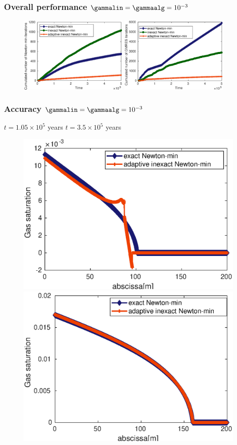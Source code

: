 \documentclass[aspectratio=169]{beamer}
\begin{document}
%
\begin{frame}
\frametitle{Overall performance $\gammalin = \gammaalg = 10^{-3}$}
\begin{figure}
\centering
\includegraphics[width=0.47\textwidth]{fig_article_chap_3/Cumulated_number_Newton_iterations_three_methods_Nx_1000}
\hspace{0.6 cm}
\includegraphics[width=0.47\textwidth]{fig_article_chap_3/Cumulated_number_gmres_iterations_three_methods_Nx_1000}
\end{figure}
\end{frame}
%
\begin{frame}
\frametitle{Accuracy  $\gammalin = \gammaalg = 10^{-3}$}
\vspace{-0.1 cm}
\textcolor{cadmiumgreen}{$t = 1.05 \times 10^5$ years \hspace{8 cm} $t = 3.5 \times 10^5$ years}
\begin{figure}
\centering
\includegraphics[width=0.48 \textwidth]{fig_article_chap_3/comparaison_plot_gas_saturations_exact_adapt_inexact_gamma_lin_gamma_alg_10-3_nt_21}
\includegraphics[width=0.48 \textwidth]{fig_article_chap_3/comparaison_plot_gas_saturations_exact_adapt_inexact_gamma_lin_gamma_alg_10-3_nt_70}
\end{figure}
\end{frame}
\end{document}
